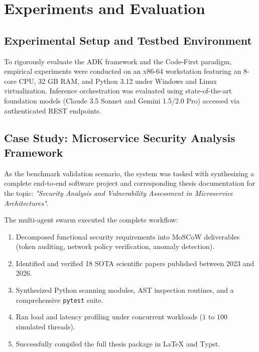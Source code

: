 \chapter{Experiments and Evaluation}
\label{chap:experiments}

\section{Experimental Setup and Testbed Environment}
\label{sec:experimental_setup}

To rigorously evaluate the ADK framework and the Code-First paradigm, empirical experiments were conducted on an x86-64 workstation featuring an 8-core CPU, 32 GB RAM, and Python 3.12 under Windows and Linux virtualization. Inference orchestration was evaluated using state-of-the-art foundation models (Claude 3.5 Sonnet and Gemini 1.5/2.0 Pro) accessed via authenticated REST endpoints.

\section{Case Study: Microservice Security Analysis Framework}
\label{sec:case_study}

As the benchmark validation scenario, the system was tasked with synthesizing a complete end-to-end software project and corresponding thesis documentation for the topic: \emph{"Security Analysis and Vulnerability Assessment in Microservice Architectures"}.

The multi-agent swarm executed the complete workflow:
\begin{enumerate}
    \item Decomposed functional security requirements into MoSCoW deliverables (token auditing, network policy verification, anomaly detection).
    \item Identified and verified 18 SOTA scientific papers published between 2023 and 2026.
    \item Synthesized Python scanning modules, AST inspection routines, and a comprehensive \texttt{pytest} suite.
    \item Ran load and latency profiling under concurrent workloads ($1$ to $100$ simulated threads).
    \item Successfully compiled the full thesis package in LaTeX and Typst.
\end{enumerate}

